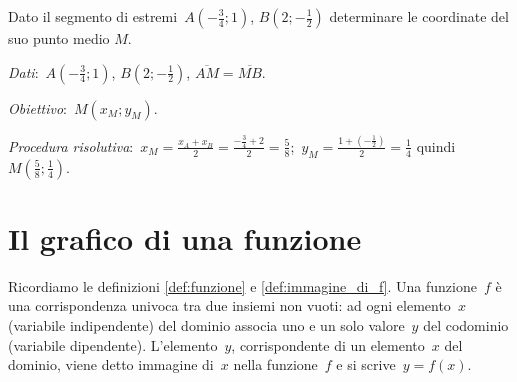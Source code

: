 \begin{exrig}
 \begin{esempio}
Dato il segmento di estremi~$A\left(-{\frac{3}{4}};1\right)$, $B\left(2;-\frac{1}{2}\right)$ determinare le coordinate del suo punto medio $M$.

\emph{Dati}:~$A\left(-{\frac{3}{4}};1\right)$, $B\left(2;-\frac{1}{2}\right)$, $\overline{AM}=\overline{MB}$.

\emph{Obiettivo}:~$M(x_{M};y_{M})$.

\emph{Procedura risolutiva}:~$x_{M}=\frac{x_{A}+x_{B}}{2}=\frac{-{\frac{3}{4}}+2}{2}=\frac{5}{8}$;\,
$y_{M}=\frac{1+\left(-{\frac{1}{2}}\right)}{2}=\frac{1}{4}$ quindi~$M\left(\frac{5}{8};\frac{1}{4}\right)$.
 \end{esempio}
\end{exrig}

\ovalbox{\risolvii \ref{ese:8.34}, \ref{ese:8.35}, \ref{ese:8.36}, \ref{ese:8.37}, \ref{ese:8.38}}


\section{Il grafico di una funzione}

Ricordiamo le definizioni \ref{def:funzione} e \ref{def:immagine_di_f}. Una funzione~$f$ è una corrispondenza univoca tra due insiemi non vuoti: ad ogni elemento~$x$ (variabile indipendente) del dominio associa uno e un solo valore~$y$ del codominio (variabile dipendente).
L'elemento~$y$, corrispondente di un elemento~$x$ del dominio, viene detto immagine di~$x$ nella funzione~$f$ e si scrive~$y=f(x)$.

